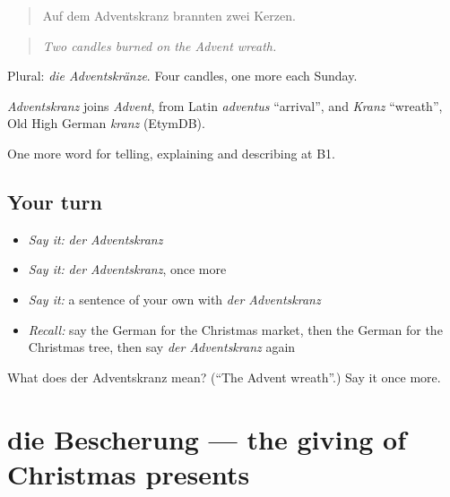 \begin{quote}
Auf dem Adventskranz brannten zwei Kerzen.
\end{quote}

\begin{quote}
\emph{Two candles burned on the Advent wreath.}
\end{quote}

Plural: \emph{die Adventskränze}. Four candles, one more each Sunday.

\begin{cousinweb}
\emph{Adventskranz} joins \emph{Advent}, from Latin \emph{adventus} \textquotedblleft{}arrival\textquotedblright{}, and \emph{Kranz} \textquotedblleft{}wreath\textquotedblright{}, Old High German \emph{kranz} (EtymDB).
\end{cousinweb}

\begin{grammarlens}[title={What you've built}]
One more word for telling, explaining and describing at B1.
\end{grammarlens}

\subsection*{Your turn}
\begin{itemize}
\raggedright
  \item \emph{Say it:} \emph{der Adventskranz}
  \item \emph{Say it:} \emph{der Adventskranz}, once more
  \item \emph{Say it:} a sentence of your own with \emph{der Adventskranz}
  \item \emph{Recall:} say the German for the Christmas market, then the German for the Christmas tree, then say \emph{der Adventskranz} again
\end{itemize}

\begin{tcolorbox}[breakable,colback=teal!4,colframe=teal!35!black,title={Before you move on}]
What does der Adventskranz mean? (\textquotedblleft{}The Advent wreath\textquotedblright{}.) Say it once more.
\end{tcolorbox}
\section[die Bescherung]{die Bescherung — the giving of Christmas presents}

\label{lesson:GE-C311-bescherung}



